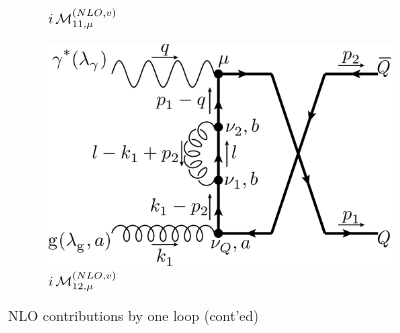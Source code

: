 \begin{figure}[ht!]
\begin{subfigure}[t]{.4\textwidth}
		\caption{$i\operatorname{\mathcal M}^{(NLO,v)}_{11,\mu}$}
	\end{subfigure}\hspace{.15\textwidth}%
	\begin{subfigure}[t]{.4\textwidth}
		\includegraphics[width=\textwidth]{pyfeyn/nlo-v-m1cr}
		\caption{$i\operatorname{\mathcal M}^{(NLO,v)}_{12,\mu}$}
	\end{subfigure}
	\caption{NLO contributions by one loop (cont'ed)}\label{fig:FeynNLOve}
\end{figure}


